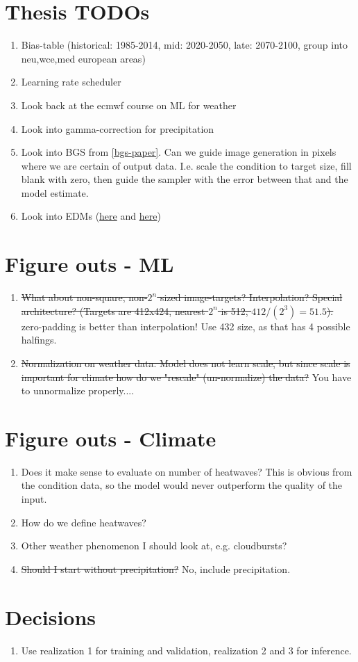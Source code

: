 \section*{Thesis TODOs}

\begin{enumerate}
    \item Bias-table (historical: 1985-2014, mid: 2020-2050, late: 2070-2100, group into neu,wce,med european areas)
    \item Learning rate scheduler
    \item Look back at the ecmwf course on ML for weather
    \item Look into gamma-correction for precipitation
    \item Look into BGS from \autoref{bgs-paper}. Can we guide image generation in pixels where we are certain of output data. I.e. scale the condition to target size, fill blank with zero, then guide the sampler with the error between that and the model estimate.
    \item Look into EDMs (\href{\url{https://egusphere.copernicus.org/preprints/2026/egusphere-2026-1139/egusphere-2026-1139.pdf}}{here} and \href{\url{https://arxiv.org/pdf/2206.00364}}{here})
\end{enumerate}

\section*{Figure outs - ML}
\begin{enumerate}
    \item \st{What about non-square, non-$2^n$ sized image-targets? Interpolation? Special architecture? (Targets are 412x424, nearest $2^n$ is 512, $412/(2^3)=51.5$).} zero-padding is better than interpolation! Use 432 size, as that has 4 possible halfings. 
    \item \st{Normalization on weather data. Model does not learn scale, but since scale is important for climate how do we "rescale" (un-normalize) the data?} You have to unnormalize properly....
\end{enumerate}

\section*{Figure outs - Climate}
\begin{enumerate}
    \item Does it make sense to evaluate on number of heatwaves? This is obvious from the condition data, so the model would never outperform the quality of the input.
    \item How do we define heatwaves?
    \item Other weather phenomenon I should look at, e.g. cloudbursts?
    \item \st{Should I start without precipitation?} No, include precipitation.
\end{enumerate}

\section*{Decisions}
\begin{enumerate}
    \item Use realization 1 for training and validation, realization 2 and 3 for inference.
\end{enumerate}
